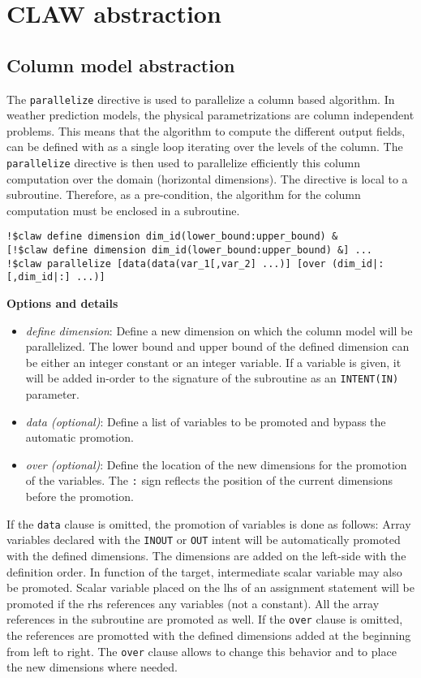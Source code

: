 \section{CLAW abstraction}


\subsection{Column model abstraction}

The \lstinline!parallelize! directive is used to parallelize a column based
algorithm. In weather prediction models, the physical parametrizations are column
independent problems. This means that the algorithm to compute the different
output fields, can be defined with as a single loop iterating over the levels of
the column.
The \lstinline!parallelize! directive is then used to parallelize efficiently this 
column computation over the domain (horizontal 
dimensions).
The directive is local to a subroutine. Therefore, as a pre-condition, the algorithm 
for the column computation must be enclosed in a subroutine.

\begin{lstlisting}
!$claw define dimension dim_id(lower_bound:upper_bound) &
[!$claw define dimension dim_id(lower_bound:upper_bound) &] ...
!$claw parallelize [data(data(var_1[,var_2] ...)] [over (dim_id|:[,dim_id|:] ...)]
\end{lstlisting}

\textbf{Options and details}
\begin{itemize}
\item \textit{define dimension}: Define a new dimension on which the column
model will be parallelized. The lower bound and upper bound of the defined
dimension can be either an integer constant or an integer variable. If a
variable is given, it will be added in-order to the signature of the subroutine
as an \lstinline!INTENT(IN)! parameter.
\item \textit{data (optional)}: Define a list of variables to be promoted and 
bypass the automatic promotion.
\item \textit{over (optional)}: Define the location of the new dimensions for 
the promotion of the variables. The \lstinline!:! sign reflects the position 
of the current dimensions before the promotion.
\end{itemize}

If the \lstinline!data! clause is omitted, the promotion of variables is done as
follows:
Array variables declared with the \lstinline!INOUT! or \lstinline!OUT! intent
will be automatically promoted with the defined dimensions. The dimensions are
added on the left-side with the definition order.
In function of the target, intermediate scalar variable may also be promoted.
Scalar variable placed on the lhs of an assignment statement will be promoted
if the rhs references any variables (not a constant).
All the array references in the subroutine are promoted as well. If the
\lstinline!over! clause is omitted, the references are promotted with the
defined dimensions added at the beginning from left to right. The
\lstinline!over! clause allows to change this behavior and to place the new
dimensions where needed.

